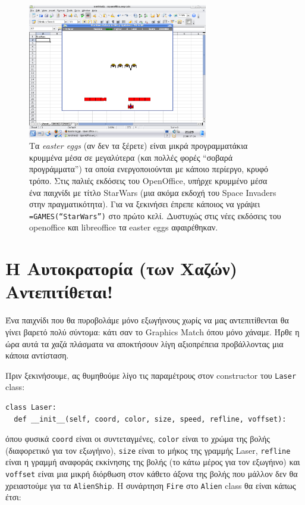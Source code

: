 \begin{figure}
\centering
\includegraphics[width=0.70\textwidth]{images/chapter9/easteregg}
\caption[Easter Eggs]{Τα \emph{easter eggs} (αν δεν τα ξέρετε) είναι μικρά προγραμματάκια κρυμμένα μέσα σε μεγαλύτερα (και πολλές φορές ``σοβαρά προγράμματα'') τα οποία ενεργοποιούνται με κάποιο περίεργο, κρυφό τρόπο. Στις παλιές εκδόσεις του OpenOffice, υπήρχε κρυμμένο μέσα ένα παιχνίδι με τίτλο StarWars (μια ακόμα εκδοχή του Space Invaders στην πραγματικότητα). Για να ξεκινήσει έπρεπε κάποιος να γράψει {\tt =GAMES(“StarWars”)} στο πρώτο κελί. Δυστυχώς στις νέες εκδόσεις του openoffice και libreoffice τα easter eggs αφαιρέθηκαν.}
\label{9-1}
\end{figure}
%
\section{Η Αυτοκρατορία (των Χαζών) Αντεπιτίθεται!}
%
Ένα παιχνίδι που θα πυροβολάμε μόνο εξωγήινους χωρίς να μας αντεπιτίθενται θα γίνει βαρετό πολύ σύντομα: κάτι σαν το Graphics Match όπου μόνο χάναμε. Ήρθε η ώρα αυτά τα χαζά πλάσματα να αποκτήσουν λίγη αξιοπρέπεια προβάλλοντας μια κάποια αντίσταση.

Πριν ξεκινήσουμε, ας θυμηθούμε λίγο τις παραμέτρους στον constructor του {\tt Laser} class:

\begin{verbatim}
class Laser:
  def __init__(self, coord, color, size, speed, refline, voffset):
\end{verbatim}

όπου φυσικά {\tt coord} είναι οι συντεταγμένες, {\tt color} είναι το χρώμα της βολής (διαφορετικό για τον εξωγήινο), {\tt size} είναι το μήκος της γραμμής Laser, {\tt refline} είναι η γραμμή αναφοράς εκκίνησης της βολής (το κάτω μέρος για τον εξωγήινο) και {\tt voffset} είναι μια μικρή διόρθωση στον κάθετο άξονα της βολής που μάλλον δεν θα χρειαστούμε για τα {\tt AlienShip}. Η συνάρτηση {\tt Fire} στο {\tt Alien} class θα είναι κάπως έτσι:

